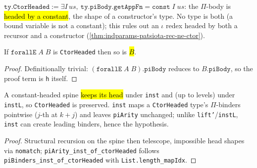 \begin{definition}
\label{def:ctorheaded}
\leanok
{} 

 $\texttt{ty.CtorHeaded} := \exists I\,us,\ \texttt{ty.piBody.getAppFn} = \texttt{const}\;I\;us$:
the $\Pi$-body is \hl{headed by a constant}, the shape of a constructor's type.
No type is both (a bound variable is not a constant); this rules out an $\iota$
redex headed by both a recursor and a constructor
(\ref{thm:indparams-patsiota-rec-ne-ctor}).
\end{definition}

\begin{lemma}
\label{thm:ctorheaded-forallE}
\leanok
{} 

 If $\texttt{forallE}\;A\;B$ is \texttt{CtorHeaded} then so is \hl{$B$}.
\end{lemma}
\begin{proof}
\leanok
{} Definitionally trivial: $(\texttt{forallE}\;A\;B).\texttt{piBody}$ reduces to
$B.\texttt{piBody}$, so the proof term is \texttt{h} itself.
\end{proof}

\begin{lemma}
\label{fam:ctorheaded-stability}
\leanok
{} 

 A constant-headed spine \hl{keeps its head} under \texttt{inst} and (up to
levels) under \texttt{instL}, so \texttt{CtorHeaded} is preserved.
\texttt{inst} maps a \texttt{CtorHeaded} type's $\Pi$-binders pointwise
($j$-th at $k+j$) and leaves \texttt{piArity} unchanged; unlike \texttt{lift'}/\texttt{instL},
\texttt{inst} can create leading binders, hence the hypothesis.
\end{lemma}
\begin{proof}
\leanok
{} Structural recursion on the spine then telescope, impossible head shapes via
\texttt{nomatch}; \texttt{piArity\_inst\_of\_ctorHeaded} follows
\texttt{piBinders\_inst\_of\_ctorHeaded} with \texttt{List.length\_mapIdx}.
\end{proof}

